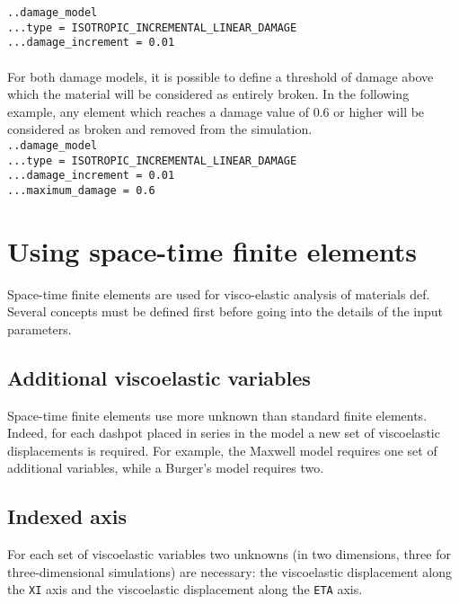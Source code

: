 \documentclass[10pt]{article}
\begin{document}
\noindent \verb+..damage_model+\\
\verb+...type = ISOTROPIC_INCREMENTAL_LINEAR_DAMAGE+\\
\verb+...damage_increment = 0.01+

\paragraph{} For both damage models, it is possible to define a threshold of damage above which the material will be considered as entirely broken. In the following example, any element which reaches a damage value of 0.6 or higher will be considered as broken and removed from the simulation.\\

\noindent \verb+..damage_model+\\
\verb+...type = ISOTROPIC_INCREMENTAL_LINEAR_DAMAGE+\\
\verb+...damage_increment = 0.01+\\
\verb+...maximum_damage = 0.6+


\section{Using space-time finite elements}

Space-time finite elements are used for visco-elastic analysis of materials def. Several concepts must be defined first before going into the details of the input parameters.

\subsection{Additional viscoelastic variables}

Space-time finite elements use more unknown than standard finite elements. Indeed, for each dashpot placed in series in the model a new set of viscoelastic displacements is required. For example, the Maxwell model requires one set of additional variables, while a Burger's model requires two.

\subsection{Indexed axis}

For each set of viscoelastic variables two unknowns (in two dimensions, three for three-dimensional simulations) are necessary: the viscoelastic displacement along the \verb+XI+ axis and the viscoelastic displacement along the \verb+ETA+ axis.
\end{document}
